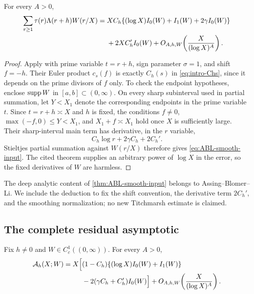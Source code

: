 \begin{theorem}
\label{thm:ABL-smooth-input}
For every $A>0$,
\begin{align}
 \sum_{r\geq1}\tau(r)\Lambda(r+h)W(r/X)
 ={}&X C_h\{(\log X)I_0(W)+I_1(W)+2\gamma I_0(W)\}
 \notag\\
 &+2X C_h'I_0(W)
 +O_{A,h,W}\!\left(\frac{X}{(\log X)^A}\right).
 \label{eq:ABL-smooth-input}
\end{align}
\end{theorem}

\begin{proof}
Apply \citet[Theorem~1.1]{AssingBlomerLi2021} with prime variable
$t=r+h$, sign parameter $\sigma=1$, and shift $f=-h$.  Their Euler product
$c_s(f)$ is exactly $C_h(s)$ in \eqref{eq:intro-Chs}, since it depends on
the prime divisors of $f$ only.  To check the endpoint hypotheses, enclose
$\operatorname{supp} W$ in $[a,b]\subset(0,\infty)$.  On every sharp subinterval used in
partial summation, let $Y<X_1$ denote the corresponding endpoints in the
prime variable $t$.  Since $t=r+h\asymp X$ and $h$ is fixed, the conditions
$f\ne0$, $\max(-f,0)\leq Y<X_1$, and $X_1+f\asymp X_1$ hold once $X$ is
sufficiently large.  Their sharp-interval main term has
derivative, in the $r$ variable,
\[
 C_h\log r+2\gamma C_h+2C_h'.
\]
Stieltjes partial summation against $W(r/X)$ therefore gives
\eqref{eq:ABL-smooth-input}.  The cited theorem supplies an arbitrary
power of $\log X$ in the error, so the fixed derivatives of $W$ are
harmless.
\end{proof}

\begin{remark}[Provenance]
The deep analytic content of \cref{thm:ABL-smooth-input} belongs to
Assing--Blomer--Li.  We include the deduction to fix the shift convention,
the derivative term $2C_h'$, and the smoothing normalization; no new
Titchmarsh estimate is claimed.
\end{remark}

\subsection{The complete residual asymptotic}

\begin{theorem}
\label{thm:complete-residual-asymptotic}
Fix $h\ne0$ and $W\in C_c^1((0,\infty))$.  For every $A>0$,
\begin{align}
 \mathcal A_h(X;W)
 =X\Big[&(1-C_h)\{(\log X)I_0(W)+I_1(W)\}
 \notag\\
 &-2(\gamma C_h+C_h')I_0(W)\Big]
 +O_{A,h,W}\!\left(\frac{X}{(\log X)^A}\right).
 \label{eq:complete-residual-asymptotic}
\end{align}
\end{theorem}

